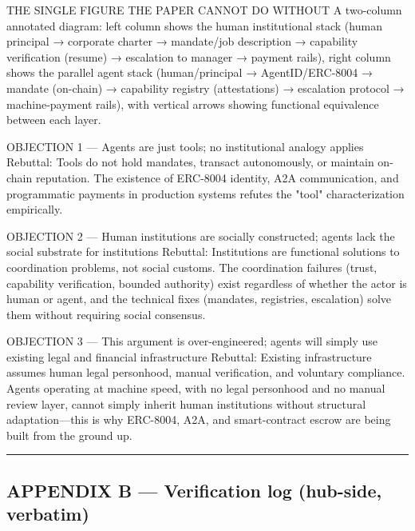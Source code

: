 \documentclass[
]{article}
\begin{document}
THE SINGLE FIGURE THE PAPER CANNOT DO WITHOUT A two-column annotated
diagram: left column shows the human institutional stack (human
principal → corporate charter → mandate/job description → capability
verification (resume) → escalation to manager → payment rails), right
column shows the parallel agent stack (human/principal →
AgentID/ERC-8004 → mandate (on-chain) → capability registry
(attestations) → escalation protocol → machine-payment rails), with
vertical arrows showing functional equivalence between each layer.

OBJECTION 1 --- Agents are just tools; no institutional analogy applies
Rebuttal: Tools do not hold mandates, transact autonomously, or maintain
on-chain reputation. The existence of ERC-8004 identity, A2A
communication, and programmatic payments in production systems refutes
the "tool" characterization empirically.

OBJECTION 2 --- Human institutions are socially constructed; agents lack
the social substrate for institutions Rebuttal: Institutions are
functional solutions to coordination problems, not social customs. The
coordination failures (trust, capability verification, bounded
authority) exist regardless of whether the actor is human or agent, and
the technical fixes (mandates, registries, escalation) solve them
without requiring social consensus.

OBJECTION 3 --- This argument is over-engineered; agents will simply use
existing legal and financial infrastructure Rebuttal: Existing
infrastructure assumes human legal personhood, manual verification, and
voluntary compliance. Agents operating at machine speed, with no legal
personhood and no manual review layer, cannot simply inherit human
institutions without structural adaptation---this is why ERC-8004, A2A,
and smart-contract escrow are being built from the ground up.

\begin{center}\rule{0.5\linewidth}{0.5pt}\end{center}

\subsection{APPENDIX B --- Verification log (hub-side,
verbatim)}\label{appendix-b--verification-log-hub-side-verbatim}
\end{document}

